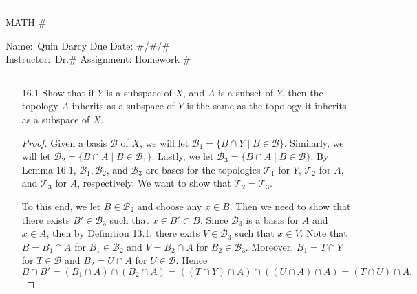 \documentclass[12pt]{article}
\theoremstyle{definition}
\begin{document}
    \thispagestyle{empty}\hrule

    \begin{center}
        \vspace{.4cm} { \large MATH \#}
    \end{center}
    {Name:\ Quin Darcy \hspace{\fill} Due Date: \#/\#/\# \\
    { Instructor:}\ Dr.\# \hspace{\fill} Assignment:
    Homework \# \\ \hrule}

    \begin{enumerate}
        \item[16.1] Show that if $Y$ is a subspace of $X$, and $A$ is a subset
            of $Y$, then the topology $A$ inherits as a subspace of $Y$ is the
            same as the topology it inherits as a subspace of $X$.
            \begin{proof}
                Given a basis $\mathcal{B}$ of $X$, we will let
                $\mathcal{B}_1=\{B\cap Y\mid B\in\mathcal{B}\}$. Similarly, we
                will let $\mathcal{B}_2=\{B\cap A\mid B\in\mathcal{B}_1\}$.
                Lastly, we let $\mathcal{B}_3=\{B\cap A\mid B\in\mathcal{B}\}$.
                By Lemma 16.1, $\mathcal{B}_1, \mathcal{B}_2$, and
                $\mathcal{B}_3$ are bases for the topologies $\mathcal{T}_1$
                for $Y$, $\mathcal{T}_2$ for $A$, and $\mathcal{T}_3$ for $A$,
                respectively. We want to show that
                $\mathcal{T}_2=\mathcal{T}_3$. \par\hspace{4mm}To this end, we let
                $B\in\mathcal{B}_2$ and choose any $x\in B$. Then we need to
                show that there exists $B'\in\mathcal{B}_3$ such that $x\in
                B'\subset B$. Since $\mathcal{B}_3$ is a basis for $A$ and
                $x\in A$, then by Definition 13.1, there exits
                $V\in\mathcal{B}_3$ such that $x\in V$. Note that $B=B_1\cap A$
                for $B_1\in\mathcal{B}_2$ and $V=B_2\cap A$ for
                $B_2\in\mathcal{B}_3$. Moreover, $B_1=T\cap Y$ for
                $T\in\mathcal{B}$ and $B_2=U\cap A$ for $U\in\mathcal{B}$.
                Hence
                \begin{equation*}
                    B\cap B'=(B_1\cap A)\cap(B_2\cap A)=((T\cap Y)\cap
                    A)\cap((U\cap A)\cap A)=(T\cap U)\cap A.
                \end{equation*}

\end{proof}
\end{enumerate}
\end{document}
